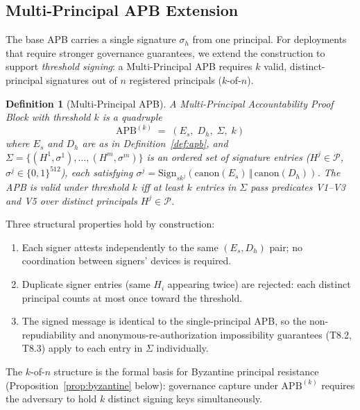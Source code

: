 \documentclass[11pt]{article}
\newtheorem{definition}{Definition}[section]
\newcommand{\Pset}{\mathcal{P}}
\newcommand{\Es}{E_s}
\newcommand{\Dh}{D_h}
\newcommand{\sigh}{\sigma_h}
\newcommand{\Hi}{H_i}
\newcommand{\APB}{\mathrm{APB}}
\begin{document}
\subsection{Multi-Principal APB Extension}
\label{sec:multi_principal}

The base APB carries a single signature $\sigh$ from one principal.
For deployments that require stronger governance guarantees, we extend
the construction to support \emph{threshold signing}: a Multi-Principal
APB requires $k$ valid, distinct-principal signatures out of $n$
registered principals ($k$-of-$n$).

\begin{definition}[Multi-Principal APB]
\label{def:multi_apb}
A \emph{Multi-Principal Accountability Proof Block} with threshold $k$
is a quadruple
\[
  \APB^{(k)} \;=\; (\Es,\;\Dh,\;\Sigma,\;k)
\]
where $\Es$ and $\Dh$ are as in Definition~\ref{def:apb}, and
$\Sigma = \{(H^1, \sigma^1), \ldots, (H^m, \sigma^m)\}$ is an
ordered set of signature entries ($H^j \in \Pset$, $\sigma^j \in
\{0,1\}^{512}$), each satisfying
$\sigma^j = \mathrm{Sign}_{sk^j}(\mathrm{canon}(\Es)
\,\Vert\, \mathrm{canon}(\Dh))$.
The APB is \emph{valid} under threshold $k$
iff at least $k$ entries in $\Sigma$ pass predicates V1--V3 and
V5 over distinct principals $H^j \in \Pset$.
\end{definition}

Three structural properties hold by construction:
\begin{enumerate}[leftmargin=2em, topsep=2pt, itemsep=2pt]
  \item Each signer attests independently to the same $(\Es, \Dh)$
        pair; no coordination between signers' devices is required.
  \item Duplicate signer entries (same $\Hi$ appearing twice) are
        rejected: each distinct principal counts at most once toward
        the threshold.
  \item The signed message is identical to the single-principal APB,
        so the non-repudiability and anonymous-re-authorization
        impossibility guarantees (T8.2, T8.3) apply to each entry
        in $\Sigma$ individually.
\end{enumerate}

The $k$-of-$n$ structure is the formal basis for Byzantine principal
resistance (Proposition~\ref{prop:byzantine} below): governance
capture under $\APB^{(k)}$ requires the adversary to hold $k$
distinct signing keys simultaneously.

\end{document}
